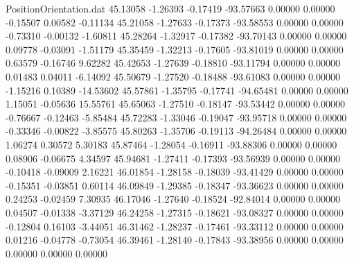\begin{filecontents}{PositionOrientation.dat}
  45.13058   -1.26393   -0.17419   -93.57663    0.00000    0.00000   -0.15507    0.00582   -0.11134
  45.21058   -1.27633   -0.17373   -93.58553    0.00000    0.00000   -0.73310   -0.00132   -1.60811
  45.28264   -1.32917   -0.17382   -93.70143    0.00000    0.00000    0.09778   -0.03091   -1.51179
  45.35459   -1.32213   -0.17605   -93.81019    0.00000    0.00000    0.63579   -0.16746    9.62282
  45.42653   -1.27639   -0.18810   -93.11794    0.00000    0.00000    0.01483    0.04011   -6.14092
  45.50679   -1.27520   -0.18488   -93.61083    0.00000    0.00000   -1.15216    0.10389  -14.53602
  45.57861   -1.35795   -0.17741   -94.65481    0.00000    0.00000    1.15051   -0.05636   15.55761
  45.65063   -1.27510   -0.18147   -93.53442    0.00000    0.00000   -0.76667   -0.12463   -5.85484
  45.72283   -1.33046   -0.19047   -93.95718    0.00000    0.00000   -0.33346   -0.00822   -3.85575
  45.80263   -1.35706   -0.19113   -94.26484    0.00000    0.00000    1.06274    0.30572    5.30183
  45.87464   -1.28054   -0.16911   -93.88306    0.00000    0.00000    0.08906   -0.06675    4.34597
  45.94681   -1.27411   -0.17393   -93.56939    0.00000    0.00000   -0.10418   -0.09009    2.16221
  46.01854   -1.28158   -0.18039   -93.41429    0.00000    0.00000   -0.15351   -0.03851    0.60114
  46.09849   -1.29385   -0.18347   -93.36623    0.00000    0.00000    0.24253   -0.02459    7.30935
  46.17046   -1.27640   -0.18524   -92.84014    0.00000    0.00000    0.04507   -0.01338   -3.37129
  46.24258   -1.27315   -0.18621   -93.08327    0.00000    0.00000   -0.12804    0.16103   -3.44051
  46.31462   -1.28237   -0.17461   -93.33112    0.00000    0.00000    0.01216   -0.04778   -0.73054
  46.39461   -1.28140   -0.17843   -93.38956    0.00000    0.00000    0.00000    0.00000    0.00000
\end{filecontents}
